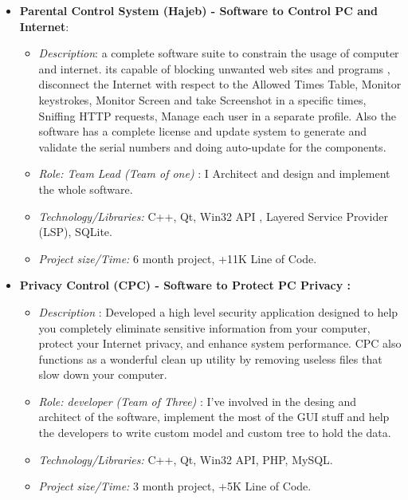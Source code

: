 \documentclass[margin,line,a4paper]{resume}
\begin{document}
\begin{resume}
\begin{itemize}
\item \textbf{Parental Control System (Hajeb) - Software to Control PC and Internet}: 
\begin{itemize}
\item \textsl{Description}: a complete software suite  to constrain the usage of computer and internet. its capable of blocking unwanted web sites and programs , disconnect the Internet with respect to the Allowed Times Table, Monitor keystrokes, Monitor Screen and take Screenshot in a specific times, Sniffing HTTP requests, Manage each user in a separate profile. Also the software has a complete license and update system to generate and validate the serial numbers and doing auto-update for the components.
 
\item  \textsl{Role: Team Lead (Team of one)} : I Architect and design and implement the whole software.

\item  \textsl{Technology/Libraries:} C++, Qt, Win32 API , Layered Service Provider (LSP), SQLite.

\item  \textsl{Project size/Time:} 6 month project,  +11K Line of Code.
\end{itemize}

\item \textbf{Privacy Control (CPC) - Software to Protect PC Privacy :}
\begin{itemize}
\item  \textsl{Description} : Developed a high level security application designed to help you completely eliminate sensitive information from your computer, protect your Internet privacy, and enhance system performance. CPC also functions as a wonderful clean up utility by removing useless files that slow down your computer. 

\item  \textsl{Role: developer (Team of Three)} : I've involved in the desing and architect of the software, implement the most of the GUI stuff and help the developers to write custom model and custom tree to hold the data.

\item  \textsl{Technology/Libraries:} C++, Qt, Win32 API, PHP, MySQL.

\item  \textsl{Project size/Time:} 3 month project,  +5K Line of Code.
\end{itemize}


\end{itemize}
\end{resume}
\end{document}
